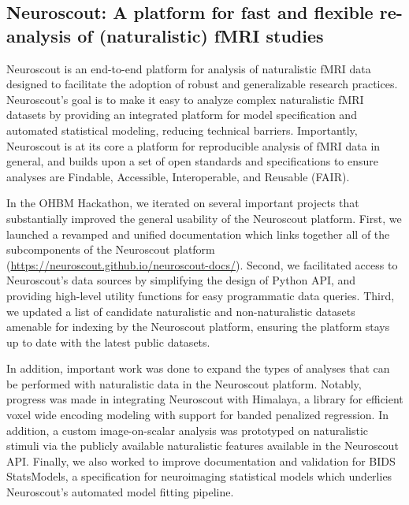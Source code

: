 \documentclass[../main.tex]{subfiles}
\begin{document}
\subsection{Neuroscout: A platform for fast and flexible re-analysis of (naturalistic) fMRI studies}\label{sec:Neuroscout}


Neuroscout is an end-to-end platform for analysis of naturalistic fMRI data designed to facilitate the adoption of robust and generalizable research practices. Neuroscout’s goal is to make it easy to analyze complex naturalistic fMRI datasets by providing an integrated platform for model specification and automated statistical modeling, reducing technical barriers. Importantly, Neuroscout is at its core a platform for reproducible analysis of fMRI data in general, and builds upon a set of open standards and specifications to ensure analyses are Findable, Accessible, Interoperable, and Reusable (FAIR). 

In the OHBM Hackathon, we iterated on several important projects that substantially improved the general usability of the Neuroscout platform. First, we launched a revamped and unified documentation which links together all of the subcomponents of the Neuroscout platform (\url{https://neuroscout.github.io/neuroscout-docs/}). Second, we facilitated access to Neuroscout’s data sources by simplifying the design of Python API, and providing high-level utility functions for easy programmatic data queries. Third, we updated a list of candidate naturalistic and non-naturalistic datasets amenable for indexing by the Neuroscout platform, ensuring the platform stays up to date with the latest public datasets. 

In addition, important work was done to expand the types of analyses that can be performed with naturalistic data in the Neuroscout platform. Notably, progress was made in integrating Neuroscout with Himalaya, a library for efficient voxel wide encoding modeling with support for banded penalized regression. In addition, a custom image-on-scalar analysis was prototyped on naturalistic stimuli via the publicly available naturalistic features available in the Neuroscout API. Finally, we also worked to improve documentation and validation for BIDS StatsModels, a specification for neuroimaging statistical models which underlies Neuroscout’s automated model fitting pipeline. 
\end{document}
